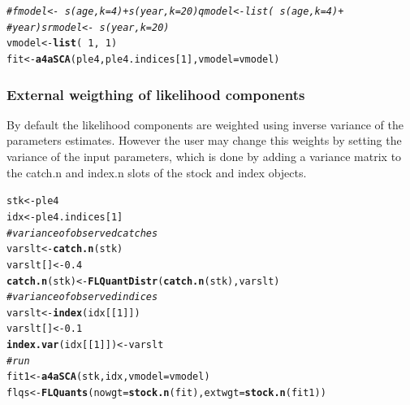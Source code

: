 \documentclass[a4paper,english,10pt]{article}\usepackage[]{graphicx}\usepackage[]{color}
\makeatletter
\newcommand{\hlnum}[1]{\textcolor[rgb]{0.686,0.059,0.569}{#1}}%
\newcommand{\hlcom}[1]{\textcolor[rgb]{0.678,0.584,0.686}{\textit{#1}}}%
\newcommand{\hlopt}[1]{\textcolor[rgb]{0,0,0}{#1}}%
\newcommand{\hlstd}[1]{\textcolor[rgb]{0.345,0.345,0.345}{#1}}%
\newcommand{\hlkwb}[1]{\textcolor[rgb]{0.69,0.353,0.396}{#1}}%
\newcommand{\hlkwc}[1]{\textcolor[rgb]{0.333,0.667,0.333}{#1}}%
\newcommand{\hlkwd}[1]{\textcolor[rgb]{0.737,0.353,0.396}{\textbf{#1}}}%
\newenvironment{kframe}{%
 \def\at@end@of@kframe{}%
 \ifinner\ifhmode%
  \def\at@end@of@kframe{\end{minipage}}%
  \begin{minipage}{\columnwidth}%
 \fi\fi%
 \def\FrameCommand##1{\hskip\@totalleftmargin \hskip-\fboxsep
 \colorbox{shadecolor}{##1}\hskip-\fboxsep
     \hskip-\linewidth \hskip-\@totalleftmargin \hskip\columnwidth}%
 \MakeFramed {\advance\hsize-\width
   \@totalleftmargin\z@ \linewidth\hsize
   \@setminipage}}%
 {\par\unskip\endMakeFramed%
 \at@end@of@kframe}
\newenvironment{knitrout}{}{} %
\makeatother
\begin{document}
\begin{knitrout}
\color{fgcolor}\begin{kframe}
\begin{alltt}
\hlcom{# fmodel <- ~ s(age, k=4) + s(year, k = 20) qmodel <- list( ~ s(age, k=4) +}
\hlcom{# year) srmodel <- ~s(year, k=20)}
\hlstd{vmodel} \hlkwb{<-} \hlkwd{list}\hlstd{(}\hlopt{~}\hlnum{1}\hlstd{,} \hlopt{~}\hlnum{1}\hlstd{)}
\hlstd{fit} \hlkwb{<-} \hlkwd{a4aSCA}\hlstd{(ple4, ple4.indices[}\hlnum{1}\hlstd{],} \hlkwc{vmodel} \hlstd{= vmodel)}
\end{alltt}
\end{kframe}
\end{knitrout}



\subsubsection{External weigthing of likelihood components}

By default the likelihood components are weighted using inverse variance of the parameters estimates. However the user may change this weights by setting the variance of the input parameters, which is done by adding a variance matrix to the catch.n and index.n slots of the stock and index objects. 

\begin{knitrout}
\color{fgcolor}\begin{kframe}
\begin{alltt}
\hlstd{stk} \hlkwb{<-} \hlstd{ple4}
\hlstd{idx} \hlkwb{<-} \hlstd{ple4.indices[}\hlnum{1}\hlstd{]}
\hlcom{# variance of observed catches}
\hlstd{varslt} \hlkwb{<-} \hlkwd{catch.n}\hlstd{(stk)}
\hlstd{varslt[]} \hlkwb{<-} \hlnum{0.4}
\hlkwd{catch.n}\hlstd{(stk)} \hlkwb{<-} \hlkwd{FLQuantDistr}\hlstd{(}\hlkwd{catch.n}\hlstd{(stk), varslt)}
\hlcom{# variance of observed indices}
\hlstd{varslt} \hlkwb{<-} \hlkwd{index}\hlstd{(idx[[}\hlnum{1}\hlstd{]])}
\hlstd{varslt[]} \hlkwb{<-} \hlnum{0.1}
\hlkwd{index.var}\hlstd{(idx[[}\hlnum{1}\hlstd{]])} \hlkwb{<-} \hlstd{varslt}
\hlcom{# run}
\hlstd{fit1} \hlkwb{<-} \hlkwd{a4aSCA}\hlstd{(stk, idx,} \hlkwc{vmodel} \hlstd{= vmodel)}
\hlstd{flqs} \hlkwb{<-} \hlkwd{FLQuants}\hlstd{(}\hlkwc{nowgt} \hlstd{=} \hlkwd{stock.n}\hlstd{(fit),} \hlkwc{extwgt} \hlstd{=} \hlkwd{stock.n}\hlstd{(fit1))}
\end{alltt}
\end{kframe}
\end{knitrout}
\end{document}
